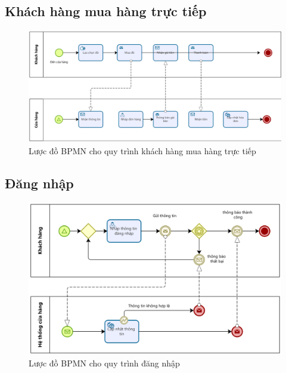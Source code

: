 \subsection{Khách hàng mua hàng trực tiếp}
\begin{figure}[!htp]
    \centering
    \includegraphics[width=14cm]{img/BPMN/Hien/Customer_buyOffline.png}
    \newline
    \caption{Lược đồ BPMN cho quy trình khách hàng mua hàng trực tiếp}
\end{figure}

\subsection{Đăng nhập}
\begin{figure}[!htp]
    \centering
    \includegraphics[width=14cm]{img/BPMN/Hien/Customer_login.png}
    \newline
    \caption{Lược đồ BPMN cho quy trình đăng nhập}
\end{figure}

